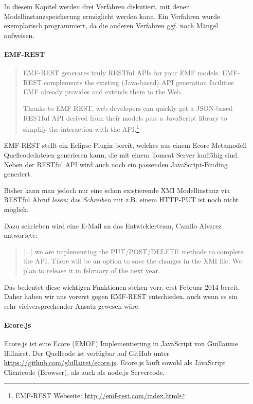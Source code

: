In diesem Kapitel werden drei Verfahren diskutiert, mit denen Modellinstanzspeicherung
ermöglicht werden kann.
Ein Verfahren wurde exemplarisch programmiert, da die anderen Verfahren ggf. noch
Mängel aufweisen.

\paragraph{EMF-REST}

\begin{quote}
EMF-REST generates truly RESTful APIs for your EMF models. EMF-REST complements the existing (Java-based) API generation facilities EMF already provides and extends them to the Web.

Thanks to EMF-REST, web developers can quickly get a JSON-based RESTful API derived from their models plus a JavaScript library to simplify the interaction with the API.\footnote{EMF-REST Webseite: \url{http://emf-rest.com/index.html}}
\end{quote}

\noindent EMF-REST stellt ein Eclipse-Plugin bereit, welches aus einem Ecore Metamodell
Quellcodedateien generieren kann, die mit einem Tomcat Server lauffähig sind.
Neben der RESTful API wird auch noch ein passenden JavaScript-Binding generiert.

Bisher kann man jedoch nur eine schon existierende XMI Modellinstanz via
RESTful Abruf \emph{lesen}; das \emph{Schreiben} mit z.B. einem HTTP-PUT
ist noch nicht möglich.

Dazu schrieben wird eine E-Mail an das Entwicklerteam, Camilo Alvarez antwortete:

\begin{quote}
[...] we are implementing the PUT/POST/DELETE methods to complete the API. There will be an option to save the changes in the XMI file.
We plan to release it in february of the next year.
\end{quote}

\noindent Das bedeutet diese wichtigen Funktionen stehen vorr. erst Februar 2014
bereit. Daher haben wir uns vorerst gegen EMF-REST entschieden, auch wenn es
ein sehr vielversprechender Ansatz gewesen wäre.

\paragraph{Ecore.js}

Ecore.js ist eine Ecore (EMOF) Implementierung in JavaScript von Guillaume Hillairet.
Der Quellcode ist verfügbar auf GitHub unter
\url{https://github.com/ghillairet/ecore.js}.
Ecore.js läuft sowohl als JavaScript Clientcode (Browser), als auch als
node.js Servercode.

